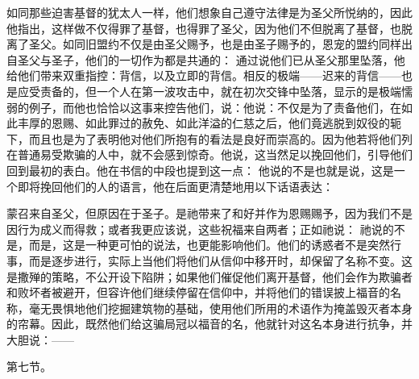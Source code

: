 如同那些迫害基督的犹太人一样，他们想象自己遵守法律是为圣父所悦纳的，因此他指出，这样做不仅得罪了基督，也得罪了圣父，因为他们不但脱离了基督，也脱离了圣父。如同旧盟约不仅是由圣父赐予，也是由圣子赐予的，恩宠的盟约同样出自圣父与圣子，他们的一切作为都是共通的： 通过说他们已从圣父那里坠落，他给他们带来双重指控：背信，以及立即的背信。相反的极端——迟来的背信——也是应受责备的，但一个人在第一波攻击中，就在初次交锋中坠落，显示的是极端懦弱的例子，而他也恰恰以这事来控告他们，说：他说：不仅是为了责备他们，在如此丰厚的恩赐、如此罪过的赦免、如此洋溢的仁慈之后，他们竟逃脱到奴役的轭下，而且也是为了表明他对他们所抱有的看法是良好而崇高的。因为他若将他们列在普通易受欺骗的人中，就不会感到惊奇。他说，这当然足以挽回他们，引导他们回到最初的表白。他在书信的中段也提到这一点： 他说的不是也就是说，这是一个即将挽回他们的人的语言，他在后面更清楚地用以下话语表达：\par

\par

蒙召来自圣父，但原因在于圣子。是祂带来了和好并作为恩赐赐予，因为我们不是因行为成义而得救；或者我更应该说，这些祝福来自两者；正如祂说： 祂说的不是，而是，这是一种更可怕的说法，也更能影响他们。他们的诱惑者不是突然行事，而是逐步进行，实际上当他们将他们从信仰中移开时，却保留了名称不变。这是撒殚的策略，不公开设下陷阱；如果他们催促他们离开基督，他们会作为欺骗者和败坏者被避开，但容许他们继续停留在信仰中，并将他们的错误披上福音的名称，毫无畏惧地他们挖掘建筑物的基础，使用他们所用的术语作为掩盖毁灭者本身的帘幕。因此，既然他们给这骗局冠以福音的名，他就针对这名本身进行抗争，并大胆说：——\par

第七节。\par

